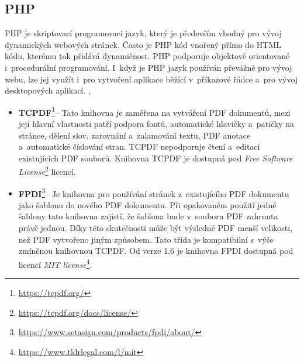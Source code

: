 \subsection*{PHP}

PHP je skriptovací programovací jazyk, který je především vhodný pro vývoj
dynamických webových stránek. Často je PHP kód vnořený přímo do HTML kódu, kterému
tak přidává dynamičnost. PHP podporuje objektově orientované i~procedurální 
programování. I~když je PHP jazyk používán převážně pro vývoj webu, lze jej využít
i~pro vytvoření aplikace běžící v~příkazové řádce a~pro vývoj
desktopových aplikací.
\cite{PHP_is}, \cite{PHP_can_do}

\begin{itemize}
    \item \textbf{TCPDF}\footnote{
    \href{https://tcpdf.org/}{https://tcpdf.org/}
    }\,--\,Tato knihovna je zaměřena na vytváření PDF dokumentů, mezi její hlavní
    vlastnosti patří podpora fontů, automatické hlavičky a~patičky na stránce,
    dělení slov, zarovnání a~zalamování textu, PDF anotace a~automatické číslování
    stran. TCPDF nepodporuje čtení a~editaci existujících PDF souborů.
    Knihovna TCPDF je dostupná pod \emph{Free Software License}\footnote{
    \href{https://tcpdf.org/docs/license/}{https://tcpdf.org/docs/license/}
    } licencí.

    

    \item \textbf{FPDI}\footnote{
    \href{https://www.setasign.com/products/fpdi/about/}{https://www.setasign.com/products/fpdi/about/}
    }\,--\,Je knihovna pro používání stránek z~existujícího PDF dokumentu jako
    šablonu do nového PDF dokumentu. Při opakovaném použití jedné šablony tato 
    knihovna zajistí, že šablona bude v~souboru PDF zahrnuta právě jednou. Díky
    této skutečnosti může být výsledné PDF menší velikosti, než PDF vytvořeno jiným
    způsobem. Tato třída je kompatibilní s~výše zmíněnou knihovnou TCPDF. Od verze
    1.6 je knihovna FPDI dostupná pod licencí \emph{MIT license}\footnote{
    \href{https://www.tldrlegal.com/l/mit}{https://www.tldrlegal.com/l/mit}
    }.

\end{itemize}


